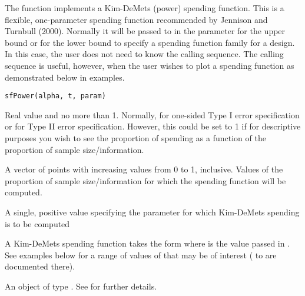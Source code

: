 \begin{Description}\relax
The function  implements a Kim-DeMets (power) spending function.
This is a flexible, one-parameter spending function recommended by Jennison and Turnbull (2000).
Normally it will be passed to  in the parameter  for the upper bound or
 for the lower bound to specify a spending function family for a design.
In this case, the user does not need to know the calling sequence.
The calling sequence is useful, however, when the user wishes to plot a spending function as demonstrated below
in examples.
\end{Description}
\begin{Usage}
\begin{verbatim}
sfPower(alpha, t, param)
\end{verbatim}
\end{Usage}
\begin{Arguments}
\begin{ldescription}
\item[\code{alpha}] Real value  and no more than 1. Normally, 
 for one-sided Type I error specification
or  for Type II error specification. However, this could be set to 1 if for descriptive purposes
you wish to see the proportion of spending as a function of the proportion of sample size/information.
\item[\code{t}] A vector of points with increasing values from 0 to 1, inclusive. Values of the proportion of 
sample size/information for which the spending function will be computed.
\item[\code{param}] A single, positive value specifying the  parameter for which Kim-DeMets spending
is to be computed
\end{ldescription}
\end{Arguments}
\begin{Details}\relax
A Kim-DeMets spending function takes the form
 where  is the value passed in .
See examples below for a range of values of  that may be of interest ( to  are documented there).
\end{Details}
\begin{Value}
An object of type . See  for further details.
\end{Value}
